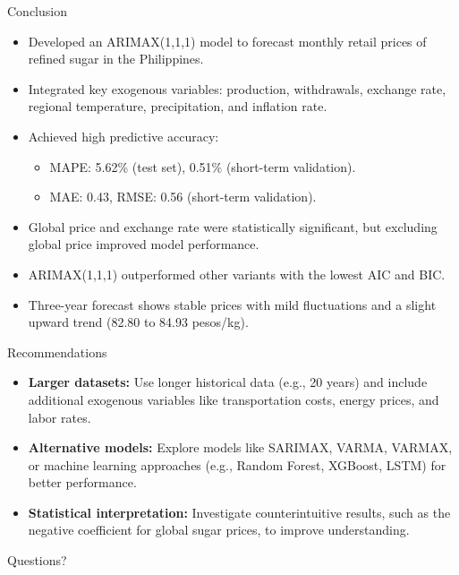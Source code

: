 \documentclass[12pt, aspectratio=169]{beamer}
\begin{document}
\begin{frame}{Conclusion}
    
\begin{itemize}
    \item Developed an ARIMAX(1,1,1) model to forecast monthly retail prices of refined sugar in the Philippines. 
    \item Integrated key exogenous variables: production, withdrawals, exchange rate, regional temperature, precipitation, and inflation rate. 
    \item Achieved high predictive accuracy:
        \begin{itemize}
            \item MAPE: 5.62\% (test set), 0.51\% (short-term validation). 
            \item MAE: 0.43, RMSE: 0.56 (short-term validation). 
        \end{itemize}
    \item Global price and exchange rate were statistically significant, but excluding global price improved model performance. 
    \item ARIMAX(1,1,1) outperformed other variants with the lowest AIC and BIC. 
    \item Three-year forecast shows stable prices with mild fluctuations and a slight upward trend (82.80 to 84.93 pesos/kg). 
\end{itemize}
\end{frame}

\begin{frame}{Recommendations}
\begin{itemize}
    \item \textbf{Larger datasets:} Use longer historical data (e.g., 20 years) and include additional exogenous variables like transportation costs, energy prices, and labor rates. 
    \item \textbf{Alternative models:} Explore models like SARIMAX, VARMA, VARMAX, or machine learning approaches (e.g., Random Forest, XGBoost, LSTM) for better performance. 
    \item \textbf{Statistical interpretation:} Investigate counterintuitive results, such as the negative coefficient for global sugar prices, to improve understanding.
\end{itemize}
\end{frame}

\begin{frame}
    \begin{tcolorbox}[colframe=theme, colback=theme]
        \begin{center}
            \Huge{Questions?}
        \end{center}
    \end{tcolorbox}
\end{frame}
\end{document}
